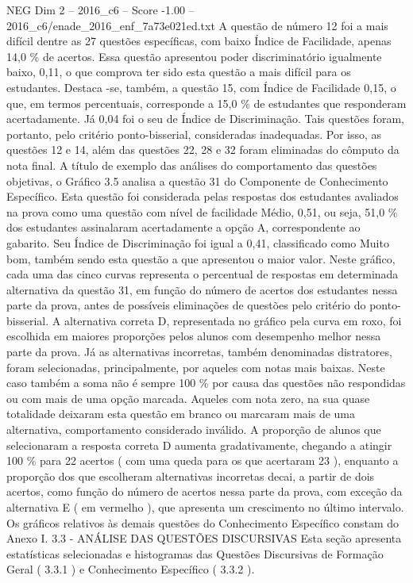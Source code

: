 \begin{textsample}{NEG Dim 2 – 2016\_c6 – Score -1.00 – 2016\_c6/enade\_2016\_enf\_7a73e021ed.txt}
A questão de número 12 foi a mais difícil dentre as 27 questões específicas, com baixo Índice de Facilidade, apenas 14,0 \% de acertos.
Essa questão apresentou poder discriminatório igualmente baixo, 0,11, o que comprova ter sido esta questão a mais difícil para os estudantes.
Destaca -se, também, a questão 15, com Índice de Facilidade 0,15, o que, em termos percentuais, corresponde a 15,0 \% de estudantes que responderam acertadamente.
Já 0,04 foi o seu de Índice de Discriminação.
Tais questões foram, portanto, pelo critério ponto-bisserial, consideradas inadequadas.
Por isso, as questões 12 e 14, além das questões 22, 28 e 32 foram eliminadas do cômputo da nota final.
A título de exemplo das análises do comportamento das questões objetivas, o Gráfico 3.5 analisa a questão 31 do Componente de Conhecimento Específico.
Esta questão foi considerada pelas respostas dos estudantes avaliados na prova como uma questão com nível de facilidade Médio, 0,51, ou seja, 51,0 \% dos estudantes assinalaram acertadamente a opção A, correspondente ao gabarito.
Seu Índice de Discriminação foi igual a 0,41, classificado como Muito bom, também sendo esta questão a que apresentou o maior valor.
Neste gráfico, cada uma das cinco curvas representa o percentual de respostas em determinada alternativa da questão 31, em função do número de acertos dos estudantes nessa parte da prova, antes de possíveis eliminações de questões pelo critério do ponto-bisserial.
A alternativa correta D, representada no gráfico pela curva em roxo, foi escolhida em maiores proporções pelos alunos com desempenho melhor nessa parte da prova.
Já as alternativas incorretas, também denominadas distratores, foram selecionadas, principalmente, por aqueles com notas mais baixas.
Neste caso também a soma não é sempre 100 \% por causa das questões não respondidas ou com mais de uma opção marcada.
Aqueles com nota zero, na sua quase totalidade deixaram esta questão em branco ou marcaram mais de uma alternativa, comportamento considerado inválido.
A proporção de alunos que selecionaram a resposta correta D aumenta gradativamente, chegando a atingir 100 \% para 22 acertos ( com uma queda para os que acertaram 23 ), enquanto a proporção dos que escolheram alternativas incorretas decai, a partir de dois acertos, como função do número de acertos nessa parte da prova, com exceção da alternativa E ( em vermelho ), que apresenta um crescimento no último intervalo.
Os gráficos relativos às demais questões do Conhecimento Específico constam do Anexo I. 3.3 - ANÁLISE DAS QUESTÕES DISCURSIVAS Esta seção apresenta estatísticas selecionadas e histogramas das Questões Discursivas de Formação Geral ( 3.3.1 ) e Conhecimento Específico ( 3.3.2 ).

\end{textsample}
